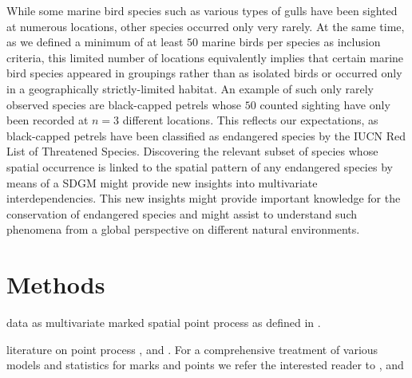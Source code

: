 \documentclass{statsoc}
\begin{document}
While some marine bird species such as various types of gulls have been sighted at numerous locations, other species occurred only very rarely. At the same time, as we defined a minimum of at least $50$ marine birds per species as inclusion criteria, this limited number of locations equivalently implies that certain marine bird species appeared in groupings rather than as isolated birds or occurred only in a geographically strictly-limited habitat. An example of such only rarely observed species are black-capped petrels whose $50$ counted sighting have only been recorded at $n=3$ different locations. This reflects our expectations, as black-capped petrels have been classified as endangered species by the IUCN Red List of Threatened Species. Discovering the relevant subset of species whose spatial occurrence is linked to the spatial pattern of any endangered species  by means of a SDGM might provide new insights into multivariate interdependencies.  This new insights might provide important knowledge for the conservation of endangered species and might assist to understand such phenomena from a global perspective on different natural environments.    



\section{Methods}

data as multivariate marked spatial point process as defined in \cite{Eckardt2016b}. 

literature on point process
\cite{Chiu2013}, \cite{Illian2008} and \cite{StoyanStoyan1994}.
For a comprehensive treatment of various models and statistics for marks and points we refer the interested reader to \cite{Illian2008}, \cite{Baddeley2010} and \cite{WiegandMoloney2013}
\end{document}

